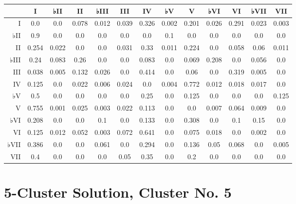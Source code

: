 \begin{table}[htbp]
\begin{minipage}{\linewidth}
\setlength{\tymax}{0.5\linewidth}
\centering
\small
\begin{tabulary}{\textwidth}{@{}RCCCCCCCCCCCC@{}} \toprule
&I&♭II&II&♭III&III&IV&♭V&V&♭VI&VI&♭VII&VII\\
\midrule
I&0.0&0.0&0.078&0.012&0.039&0.326&0.002&0.201&0.026&0.291&0.023&0.003\\
♭II&0.9&0.0&0.0&0.0&0.0&0.0&0.1&0.0&0.0&0.0&0.0&0.0\\
II&0.254&0.022&0.0&0.0&0.031&0.33&0.011&0.224&0.0&0.058&0.06&0.011\\
♭III&0.24&0.083&0.26&0.0&0.0&0.083&0.0&0.069&0.208&0.0&0.056&0.0\\
III&0.038&0.005&0.132&0.026&0.0&0.414&0.0&0.06&0.0&0.319&0.005&0.0\\
IV&0.125&0.0&0.022&0.006&0.024&0.0&0.004&0.772&0.012&0.018&0.017&0.0\\
♭V&0.5&0.0&0.0&0.0&0.0&0.25&0.0&0.125&0.0&0.0&0.0&0.125\\
V&0.755&0.001&0.025&0.003&0.022&0.113&0.0&0.0&0.007&0.064&0.009&0.0\\
♭VI&0.208&0.0&0.0&0.1&0.0&0.133&0.0&0.308&0.0&0.1&0.15&0.0\\
VI&0.125&0.012&0.052&0.003&0.072&0.641&0.0&0.075&0.018&0.0&0.002&0.0\\
♭VII&0.386&0.0&0.0&0.061&0.0&0.294&0.0&0.136&0.05&0.068&0.0&0.005\\
VII&0.4&0.0&0.0&0.0&0.05&0.35&0.0&0.2&0.0&0.0&0.0&0.0\\

\bottomrule

\end{tabulary}
\end{minipage}
\end{table}

\section{5-Cluster Solution, Cluster No. 5}
\label{5-clustersolutionclusterno.5}

